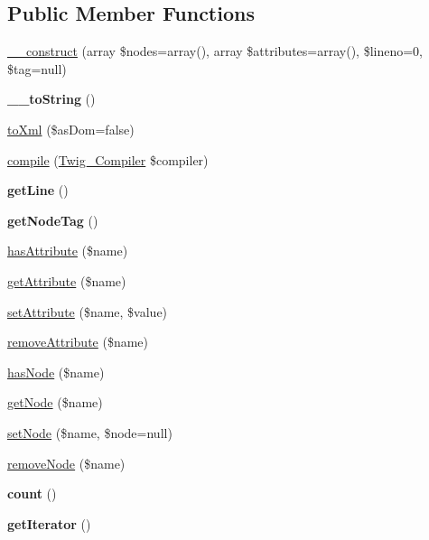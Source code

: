 \subsection*{Public Member Functions}
\begin{DoxyCompactItemize}
\item 
\hyperlink{class_twig___node_a1aa1f1818967a7b79c84c6a2c795ccd8}{\+\_\+\+\_\+construct} (array \$nodes=array(), array \$attributes=array(), \$lineno=0, \$tag=null)
\item 
\hypertarget{class_twig___node_a7516ca30af0db3cdbf9a7739b48ce91d}{}{\bfseries \+\_\+\+\_\+to\+String} ()\label{class_twig___node_a7516ca30af0db3cdbf9a7739b48ce91d}

\item 
\hyperlink{class_twig___node_a8ef6547f4e489ba6353e4d96ec48e7a8}{to\+Xml} (\$as\+Dom=false)
\item 
\hyperlink{class_twig___node_a4e0faa87c3fae583620b84d3607085da}{compile} (\hyperlink{class_twig___compiler}{Twig\+\_\+\+Compiler} \$compiler)
\item 
\hypertarget{class_twig___node_aef9c32f6066788a101028a1d4150f8cb}{}{\bfseries get\+Line} ()\label{class_twig___node_aef9c32f6066788a101028a1d4150f8cb}

\item 
\hypertarget{class_twig___node_ade3006d746f2e1ba1df08da2d613a632}{}{\bfseries get\+Node\+Tag} ()\label{class_twig___node_ade3006d746f2e1ba1df08da2d613a632}

\item 
\hyperlink{class_twig___node_ac78ba27a41d0291c61326022489d4986}{has\+Attribute} (\$name)
\item 
\hyperlink{class_twig___node_ae954da422d40fc286691e54679e44c6f}{get\+Attribute} (\$name)
\item 
\hyperlink{class_twig___node_a545f43e4d937e0e272a4bafe8b411d55}{set\+Attribute} (\$name, \$value)
\item 
\hyperlink{class_twig___node_abbf04707cf678979459a4438e1450876}{remove\+Attribute} (\$name)
\item 
\hyperlink{class_twig___node_a4cc984156551609a68bf36368dca7f6b}{has\+Node} (\$name)
\item 
\hyperlink{class_twig___node_a071882cdcc51912c1025915e76680f42}{get\+Node} (\$name)
\item 
\hyperlink{class_twig___node_af59671ebefa5b3c066db692e05c80303}{set\+Node} (\$name, \$node=null)
\item 
\hyperlink{class_twig___node_a38ca670ed45c0c11aa8462f67f2ec7bd}{remove\+Node} (\$name)
\item 
\hypertarget{class_twig___node_ac751e87b3d4c4bf2feb03bee8b092755}{}{\bfseries count} ()\label{class_twig___node_ac751e87b3d4c4bf2feb03bee8b092755}

\item 
\hypertarget{class_twig___node_a7a9f937c2958e6f4dd7b030f86fb70b7}{}{\bfseries get\+Iterator} ()\label{class_twig___node_a7a9f937c2958e6f4dd7b030f86fb70b7}

\end{DoxyCompactItemize}
